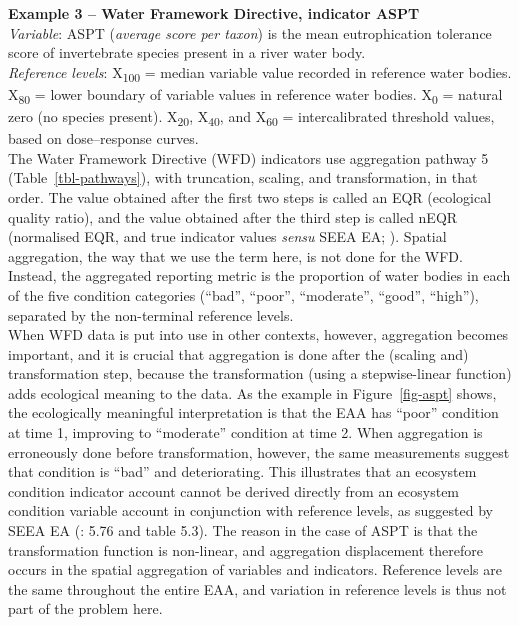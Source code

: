 \documentclass[
  authoryear,
  preprint,
  3p]{elsarticle}
\begin{document}
\begin{tcolorbox}[enhanced jigsaw, colback=white, toprule=.15mm, breakable, opacityback=0, arc=.35mm, left=2mm, bottomrule=.15mm, leftrule=.75mm, colframe=quarto-callout-note-color-frame, rightrule=.15mm]

\textbf{Example 3 -- Water Framework Directive, indicator ASPT}\\

\emph{Variable}: ASPT (\emph{average score per taxon}) is the mean
eutrophication tolerance score of invertebrate species present in a
river water body.\\

\emph{Reference levels}: X\textsubscript{100} = median variable value
recorded in reference water bodies. X\textsubscript{80} = lower boundary
of variable values in reference water bodies. X\textsubscript{0} =
natural zero (no species present). X\textsubscript{20},
X\textsubscript{40}, and X\textsubscript{60} = intercalibrated threshold
values, based on dose--response curves.\\

The Water Framework Directive (WFD) indicators use aggregation pathway 5
(Table~\ref{tbl-pathways}), with truncation, scaling, and
transformation, in that order. The value obtained after the first two
steps is called an EQR (ecological quality ratio), and the value
obtained after the third step is called nEQR (normalised EQR, and true
indicator values \emph{sensu} SEEA EA;
\citet{van_de_bund_ecological_2007}). Spatial aggregation, the way that
we use the term here, is not done for the WFD. Instead, the aggregated
reporting metric is the proportion of water bodies in each of the five
condition categories (``bad'', ``poor'', ``moderate'', ``good'',
``high''), separated by the non-terminal reference levels.~\\

When WFD data is put into use in other contexts, however, aggregation
becomes important, and it is crucial that aggregation is done after the
(scaling and) transformation step, because the transformation (using a
stepwise-linear function) adds ecological meaning to the data. As the
example in Figure~\ref{fig-aspt} shows, the ecologically meaningful
interpretation is that the EAA has ``poor'' condition at time 1,
improving to ``moderate'' condition at time 2. When aggregation is
erroneously done before transformation, however, the same measurements
suggest that condition is ``bad'' and deteriorating. This illustrates
that an ecosystem condition indicator account cannot be derived directly
from an ecosystem condition variable account in conjunction with
reference levels, as suggested by SEEA EA (\citet{unitednations2024}:
5.76 and table 5.3). The reason in the case of ASPT is that the
transformation function is non-linear, and aggregation displacement
therefore occurs in the spatial aggregation of variables and indicators.
Reference levels are the same throughout the entire EAA, and variation
in reference levels is thus not part of the problem here.~\\


\end{tcolorbox}
\end{document}
